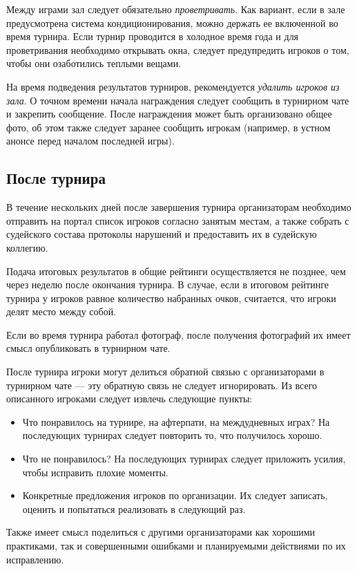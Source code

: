Между играми зал следует обязательно \textit{проветривать}. Как вариант, если в зале предусмотрена система кондиционирования, можно держать ее включенной во время турнира. Если турнир проводится в холодное время года и для проветривания необходимо открывать окна, следует предупредить игроков о том, чтобы они озаботились теплыми вещами.

На время подведения результатов турниров, рекомендуется \textit{удалить игроков из зала}. О точном времени начала награждения следует сообщить в турнирном чате и закрепить сообщение. После награждения может быть организовано общее фото, об этом также следует заранее сообщить игрокам (например, в устном анонсе перед началом последней игры).

\subsection{После турнира}

В течение нескольких дней после завершения турнира организаторам необходимо отправить на портал список игроков согласно занятым местам, а также собрать с судейского состава протоколы нарушений и предоставить их в судейскую коллегию.

Подача итоговых результатов в общие рейтинги осуществляется не позднее, чем через неделю после окончания турнира. В случае, если в итоговом рейтинге турнира у игроков равное количество набранных очков, считается, что игроки делят место между собой.

Если во время турнира работал фотограф, после получения фотографий их имеет смысл опубликовать в турнирном чате.

После турнира игроки могут делиться обратной связью с организаторами в турнирном чате --- эту обратную связь не следует игнорировать. Из всего описанного игроками следует извлечь следующие пункты:
\begin{itemize}
	\item Что понравилось на турнире, на афтерпати, на междудневных играх? На последующих турнирах следует повторить то, что получилось хорошо.
	\item Что не понравилось? На последующих турнирах следует приложить усилия, чтобы исправить плохие моменты.
	\item Конкретные предложения игроков по организации. Их следует записать, оценить и попытаться реализовать в следующий раз.
\end{itemize}

Также имеет смысл поделиться с другими организаторами как хорошими практиками, так и совершенными ошибками и планируемыми действиями по их исправлению. 